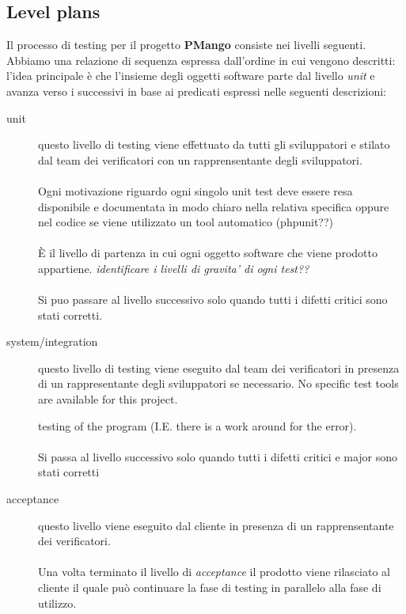 \subsection{Level plans}
\label{subsec:strategy}
Il processo di testing per il progetto \textbf{PMango} consiste nei livelli
seguenti. Abbiamo una relazione di sequenza espressa dall'ordine in cui vengono
descritti: l'idea principale \`e che l'insieme degli oggetti software parte dal
livello \emph{unit} e avanza verso i successivi in base ai predicati espressi
nelle seguenti descrizioni:
\begin{description} 
\item[unit] questo livello di testing viene effettuato da tutti gli
sviluppatori e stilato dal team dei verificatori con un rapprensentante degli
sviluppatori. 
\\ \\
Ogni motivazione riguardo ogni singolo unit test deve essere resa disponibile e
documentata in modo chiaro nella relativa specifica oppure nel codice se viene
utilizzato un tool automatico (phpunit??)
\\ \\
\`E il livello di partenza in cui ogni oggetto software che viene prodotto
appartiene. \emph{identificare i livelli di gravita' di ogni test??}
\\ \\
Si puo passare al livello successivo solo quando tutti i difetti critici sono
stati corretti.

\item[system/integration] questo livello di testing viene eseguito dal
team dei verificatori in presenza di un rappresentante degli sviluppatori
se necessario. No specific test tools are available for this project. 

 testing of the program (I.E. there is a work around for the error).
\\ \\
Si passa al livello successivo solo quando tutti i difetti critici e major sono
stati corretti

\item[acceptance] questo livello viene eseguito dal cliente in presenza di un
rapprensentante dei verificatori.
\\ \\
Una volta terminato il livello di \emph{acceptance} il prodotto viene
rilasciato al cliente il quale pu\`o continuare la fase di testing in parallelo
alla fase di utilizzo.

\end{description}

